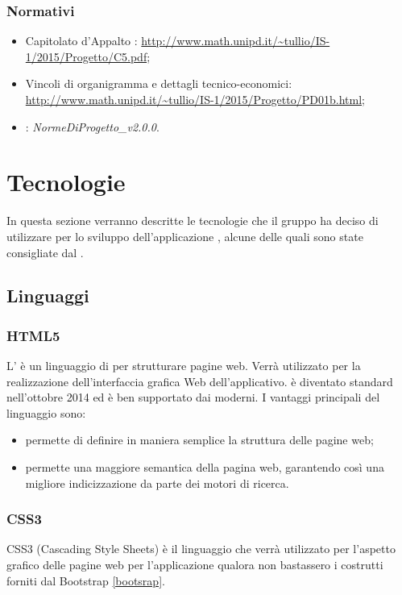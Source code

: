 \documentclass[12pt,a4paper]{article}
\begin{document}
\subsubsection{Normativi}
\begin{itemize}
	\item Capitolato d’Appalto \prjL: \url{http://www.math.unipd.it/~tullio/IS-1/2015/Progetto/C5.pdf};
	\item Vincoli di organigramma e dettagli tecnico-economici: \url{http://www.math.unipd.it/~tullio/IS-1/2015/Progetto/PD01b.html};
	\item \NdP: \textit{NormeDiProgetto\_v2.0.0}. 
\end{itemize}

\newpage

\section{Tecnologie}\label{tecnologie}
In questa sezione verranno descritte le tecnologie che il gruppo ha deciso di utilizzare per lo sviluppo dell'applicazione \prjL{}, alcune delle quali sono state consigliate dal .


\subsection{Linguaggi}
\subsubsection{HTML5}
L’ è un linguaggio di  per strutturare pagine web. Verrà utilizzato per la realizzazione dell’interfaccia grafica Web dell’applicativo.  è diventato standard  nell’ottobre 2014 ed è ben supportato dai  moderni.
I vantaggi principali del linguaggio sono:
\begin{itemize}
	\item permette di definire in maniera semplice la struttura delle pagine web;
	\item permette una maggiore semantica della pagina web, garantendo così una migliore indicizzazione da parte dei motori di ricerca.
\end{itemize}

\subsubsection{CSS3}
CSS3 (Cascading Style Sheets) è il linguaggio che verrà utilizzato per l’aspetto grafico delle pagine web per l'applicazione qualora non bastassero i costrutti forniti dal
 Bootstrap \ref{bootsrap}.
\end{document}
